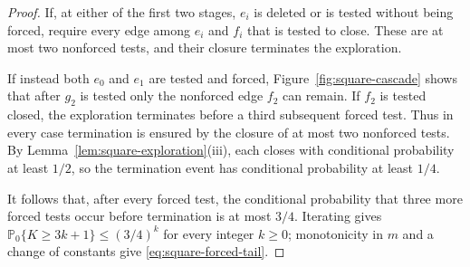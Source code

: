 \documentclass[11pt]{amsart}
\theoremstyle{plain}
\theoremstyle{definition}
\renewcommand{\P}{\mathbb P}
\begin{document}
\begin{proof}
		If, at either of the first two stages, $e_i$ is deleted or is tested without
		being forced, require every edge among $e_i$ and $f_i$ that is tested to close.
		These are at most two nonforced tests, and their closure terminates the
		exploration.

		If instead both $e_0$ and $e_1$ are tested and forced, Figure~\ref{fig:square-cascade}
		shows that after $g_2$ is tested only the nonforced edge $f_2$ can remain.  If
		$f_2$ is tested closed, the exploration terminates before a third subsequent
		forced test.  Thus in every case termination is ensured by the closure of at
		most two nonforced tests.  By
		Lemma~\ref{lem:square-exploration}\textup{(iii)}, each closes with conditional
		probability at least $1/2$, so the termination event has conditional probability
		at least $1/4$.

		It follows that, after every forced test, the conditional probability that three
		more forced tests occur before termination is at most $3/4$.  Iterating gives
		$\P_0\{K\geq3k+1\}\leq(3/4)^k$ for every integer $k\geq0$; monotonicity in $m$
		and a change of constants give \eqref{eq:square-forced-tail}.
	\end{proof}
	
\end{document}
